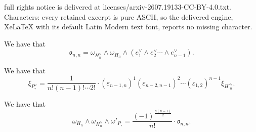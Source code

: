 \documentclass[10pt,a4paper]{amsart}
\begin{document}
full rights notice is delivered at licenses/arxiv-2607.19133-CC-BY-4.0.txt. Characters: every retained excerpt is pure ASCII, so the delivered engine, XeLaTeX with its default Latin Modern text font, reports no missing character.
	\begin{lemp}\label{lemB}
		We have that
		\[
		\mathfrak{o}_{n,n}=\omega_{H^{\vee}_n}\wedge\omega_{H_n}\wedge\left(e_{1}^{\vee}\wedge e_{2}^{\vee}\cdots\wedge e_{n-1}^{\vee}\right).
		\]
	\end{lemp}

	\begin{lemp}\label{lemC}
		We have that
		\[
		\xi_{P_{\circ}^{\vee}}=\frac{1}{n!(n-1)!\cdots 2!}\cdot(\varepsilon_{n-1,n})^1(\varepsilon_{n-2,n-1})^2\cdots(\varepsilon_{1,2})^{n-1}\xi_{H'^{\vee}_n}.
		\]
	\end{lemp}

	\begin{lemp}\label{lemD}
		We have that
		\[
		\omega_{H_n}\wedge\omega_{H_n^{\vee}}\wedge\omega'_{P_{\circ}}=\frac{(-1)^{\frac{n(n-1)}{2}}}{n!}\cdot\mathfrak{o}_{n,n}.
		\]
	\end{lemp}
\end{document}
